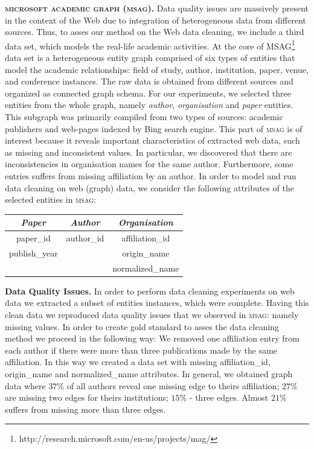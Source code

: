 \textbf{\textsc{microsoft academic graph (msag)}.} Data quality issues are massively present in the context of the Web due to integration of heterogeneous data from different sources. Thus, to asses our method on the Web data cleaning, we include a third data set, which models the real-life academic activities. At the core of MSAG\footnote{http://research.microsoft.com/en-us/projects/mag/} data set \cite{msag2015} is a heterogeneous entity graph comprised of six types of entities that model the academic relationships: field of study, author, institution, paper, venue, and conference instances. The raw data is obtained from different sources and organized as connected graph schema. For our experiments, we selected three entities from the whole graph, namely \textit{author}, \textit{organisation} and \textit{paper} entities. This subgraph was primarily compiled from two types of sources: academic publishers and web-pages indexed by Bing search engine. This part of \textsc{msag} is of interest because it reveals important characteristics of extracted web data, such as missing and inconsistent values. In particular, we discovered that there are inconsistencies in organisation names for the same author. Furthermore, some entries suffers from missing affiliation by an author. In order to model and run data cleaning on web (graph) data, we consider the following attributes of the selected entities in \textsc{msag}: 
\begin{table}[h]\footnotesize
\scriptsize
\centering
\begin{tabular}{ccc}
\textbf{\textit{Paper}}         & \textbf{\textit{Author}}     & \textbf{\textit{Organisation}}      \\ \hline
\textsf{paper\_id}     & \textsf{author\_id} & \textsf{affiliation\_id}  \\
\textsf{publish\_year} &            & \textsf{origin\_name}     \\
              &            & \textsf{normalized\_name}\\ \hline
\end{tabular}
\end{table}

\textbf{Data Quality Issues.} In order to perform data cleaning experiments on web data we extracted a subset of entities instances, which were complete. Having this clean data we reproduced data quality issues that we observed in \textsc{msag}: namely missing values. In order to create gold standard to asses the data cleaning method we proceed in the following way: We removed one affiliation entry from each author if there were more than three publications made by the same affiliation. In this way we created a data set with missing \textsf{affiliation\_id}, \textsf{origin\_name} and \textsf{normalized\_name} attributes. In general, we obtained graph data where $37\%$ of all authors reveal one missing edge to theirs affiliation; $27\%$ are missing two edges for theirs institutions; $15\%$ - three edges. Almost $21\%$ suffers from missing more than three edges. 

